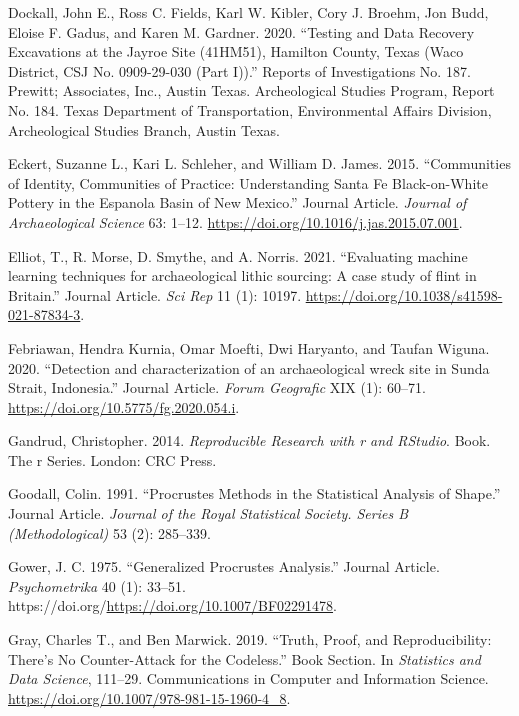 \documentclass[smallextended]{svjour3}       %
\newlength{\cslhangindent}
\newlength{\cslentryspacingunit} %
\newenvironment{CSLReferences}[2] %
 {%
  \setlength{\parindent}{0pt}
  \ifodd #1
  \let\oldpar\par
  \def\par{\hangindent=\cslhangindent\oldpar}
  \fi
  \setlength{\parskip}{#2\cslentryspacingunit}
 }%
 {}
\begin{document}
\begin{CSLReferences}{1}{0}
\leavevmode{}%
Dockall, John E., Ross C. Fields, Karl W. Kibler, Cory J. Broehm, Jon
Budd, Eloise F. Gadus, and Karen M. Gardner. 2020. {``{Testing and Data
Recovery Excavations at the Jayroe Site (41HM51), Hamilton County, Texas
(Waco District, CSJ No. 0909-29-030 (Part I))}.''} Reports of
Investigations No. 187. Prewitt; Associates, Inc., Austin Texas.
Archeological Studies Program, Report No. 184. Texas Department of
Transportation, Environmental Affairs Division, Archeological Studies
Branch, Austin Texas.

\leavevmode{}%
Eckert, Suzanne L., Kari L. Schleher, and William D. James. 2015.
{``{Communities of Identity, Communities of Practice: Understanding
Santa Fe Black-on-White Pottery in the Espanola Basin of New Mexico}.''}
Journal Article. \emph{Journal of Archaeological Science} 63: 1--12.
\url{https://doi.org/10.1016/j.jas.2015.07.001}.

\leavevmode{}%
Elliot, T., R. Morse, D. Smythe, and A. Norris. 2021. {``{Evaluating
machine learning techniques for archaeological lithic sourcing: A case
study of flint in Britain}.''} Journal Article. \emph{Sci Rep} 11 (1):
10197. \url{https://doi.org/10.1038/s41598-021-87834-3}.

\leavevmode{}%
Febriawan, Hendra Kurnia, Omar Moefti, Dwi Haryanto, and Taufan Wiguna.
2020. {``{Detection and characterization of an archaeological wreck site
in Sunda Strait, Indonesia}.''} Journal Article. \emph{Forum Geografic}
XIX (1): 60--71. \url{https://doi.org/10.5775/fg.2020.054.i}.

\leavevmode{}%
Gandrud, Christopher. 2014. \emph{Reproducible Research with r and
RStudio}. Book. The r Series. London: CRC Press.

\leavevmode{}%
Goodall, Colin. 1991. {``{Procrustes Methods in the Statistical Analysis
of Shape}.''} Journal Article. \emph{Journal of the Royal Statistical
Society. Series B (Methodological)} 53 (2): 285--339.

\leavevmode{}%
Gower, J. C. 1975. {``{Generalized Procrustes Analysis}.''} Journal
Article. \emph{Psychometrika} 40 (1): 33--51.
https://doi.org/\url{https://doi.org/10.1007/BF02291478}.

\leavevmode{}%
Gray, Charles T., and Ben Marwick. 2019. {``Truth, Proof, and
Reproducibility: There's No Counter-Attack for the Codeless.''} Book
Section. In \emph{Statistics and Data Science}, 111--29. Communications
in Computer and Information Science.
\url{https://doi.org/10.1007/978-981-15-1960-4_8}.


\end{CSLReferences}
\end{document}

